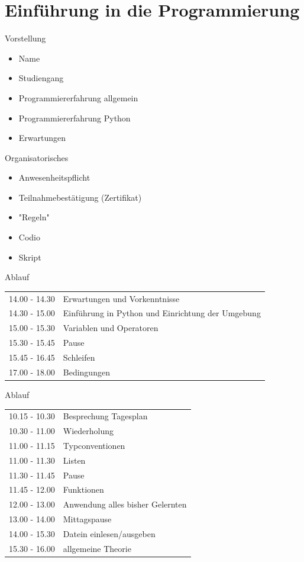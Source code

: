 \section{Einführung in die Programmierung}

\begin{frame}{Vorstellung}
\begin{itemize}
	\item Name
	\item Studiengang 
	\item Programmiererfahrung allgemein
	\item Programmiererfahrung Python
	\item Erwartungen
\end{itemize}
\end{frame}

\begin{frame}{Organisatorisches}
    \begin{itemize}
        \item Anwesenheitspflicht
        \item Teilnahmebestätigung (Zertifikat)
        \item "Regeln"
        \item Codio
        \item Skript
    \end{itemize}
\end{frame}

\begin{frame}{Ablauf}
\begin{tabular}{ l l }
	14.00 - 14.30 & Erwartungen und Vorkenntnisse\\
	14.30 - 15.00 & Einführung in Python und Einrichtung der Umgebung \\
	15.00 - 15.30 & Variablen und Operatoren\\
	15.30 - 15.45 & Pause \\
	15.45 - 16.45 & Schleifen \\
	17.00 - 18.00 & Bedingungen\\
	
\end{tabular}
\end{frame}

\begin{frame}{Ablauf}

\begin{tabular}{ l l }
	10.15 - 10.30 & Besprechung Tagesplan\\
	10.30 - 11.00 & Wiederholung \\
	11.00 - 11.15 & Typconventionen\\
	11.00 - 11.30 & Listen \\
	11.30 - 11.45 & Pause\\
	11.45 - 12.00 & Funktionen\\
	12.00 - 13.00 & Anwendung alles bisher Gelernten\\
	13.00 - 14.00 & Mittagspause\\
	14.00 - 15.30 & Datein einlesen/ausgeben\\
	15.30 - 16.00 & allgemeine Theorie\\
	
\end{tabular}
\end{frame}

